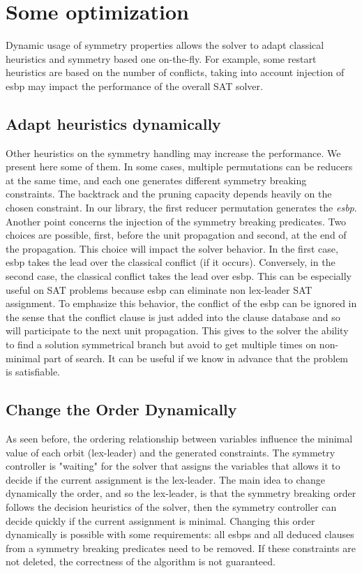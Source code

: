 \section{Some optimization}
Dynamic usage of symmetry properties allows the solver to adapt classical heuristics and symmetry based one on-the-fly.
For example, some restart heuristics are based on the number of conflicts, taking into account injection of esbp may impact
the performance of the overall SAT solver. 
\subsection{Adapt heuristics dynamically}
Other heuristics on the symmetry handling may increase the performance. We present here some of them.
In some cases, multiple permutations can be reducers at the same time, and each one generates different symmetry breaking constraints.
The backtrack and the pruning capacity depends heavily on the chosen constraint. In our library, the first reducer permutation generates the \textit{esbp}. 
Another point concerns the injection of the symmetry breaking predicates. Two choices are possible, first,
before the unit propagation and second, at the end of the propagation. This choice will impact the solver behavior.
In the first case, esbp takes the lead over the classical conflict (if it occurs). Conversely, in the second case, the classical conflict
takes the lead over esbp. This can be especially useful on SAT problems because esbp can eliminate non lex-leader SAT assignment.
To emphasize this behavior, the conflict of the esbp can be ignored in the sense that the conflict clause is just added into the clause database and so will participate to the next unit propagation. This gives to the solver the ability to find a solution symmetrical branch but avoid to get multiple times on non-minimal part of search. It can be useful if we know in advance that the problem is satisfiable.

\subsection{Change the Order Dynamically}
As seen before, the ordering relationship between variables influence the minimal value of each orbit (lex-leader) and the generated constraints. The symmetry controller is "waiting" for the solver that assigns the variables that allows it to decide if the current assignment is the lex-leader.
The main idea to change dynamically the order, and so the lex-leader, is that the symmetry breaking order follows the decision heuristics of the solver, then the symmetry controller can decide quickly if the current assignment is minimal.
Changing this order dynamically is possible with some requirements: all esbps  and all deduced 
clauses from a symmetry breaking predicates need to be removed. If these constraints are not deleted,
the correctness of the algorithm is not guaranteed.


